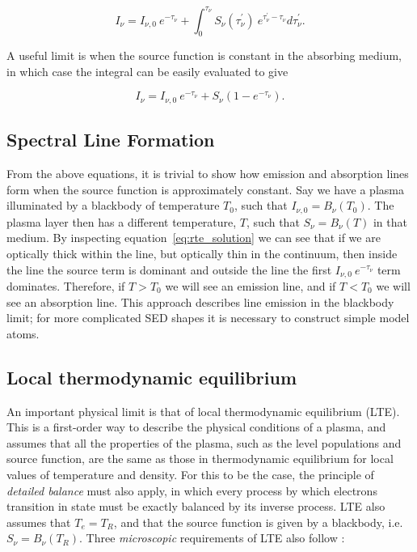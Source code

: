 \begin{equation}
I_\nu = I_{\nu,0}~e^{-\tau_\nu} + \int^{\tau_\nu}_0 S_\nu (\tau^\prime_\nu)~e^{\tau^\prime_\nu-\tau_\nu} d \tau^\prime_\nu.
\label{eq:rte_solution}
\end{equation}

A useful limit is when the source function is constant in the absorbing medium, in which case
the integral can be easily evaluated to give

\begin{equation}
I_\nu = I_{\nu,0}~e^{-\tau_\nu} + S_\nu (1 - e^{-\tau_\nu}).
\label{eq:rte_solution}
\end{equation}




\subsection{Spectral Line Formation}

From the above equations, it is trivial to show how emission and absorption lines form when
the source function is approximately constant.
Say we have a plasma illuminated by a blackbody of temperature $T_0$, such that
$I_{\nu,0} = B_\nu (T_0)$. The plasma layer then has a different temperature, $T$,
such that $S_\nu = B_\nu (T)$ in that medium. By inspecting equation~\ref{eq:rte_solution}
we can see that if we are optically thick within the line, but optically
thin in the continuum, then inside the line the source term is dominant and outside 
the line the first $I_{\nu,0}~e^{-\tau_\nu}$ term dominates. Therefore, if $T > T_0$ we will 
see an emission line, and if $T < T_0$ we will see an absorption line. 
This approach describes line emission in the blackbody limit; for more complicated SED shapes
it is necessary to construct simple model atoms.

\subsection{Local thermodynamic equilibrium}
\label{sec:lte}


An important physical limit is that of local thermodynamic equilibrium (LTE).
This is a first-order way to describe the physical conditions of a plasma, and assumes
that all the properties of the plasma, such as the level populations and source function,
are the same as those in thermodynamic equilibrium for local values of 
temperature and density. For this to be the case, the principle of 
{\em detailed balance} must also apply, in which every 
process by which electrons transition in state must be exactly 
balanced by its inverse process. LTE also assumes that $T_e = T_R$, and that
the source function is given by a blackbody, i.e. $S_\nu = B_\nu (T_R)$.
Three {\em microscopic} 
requirements of LTE also follow \citep{mihalas}:

